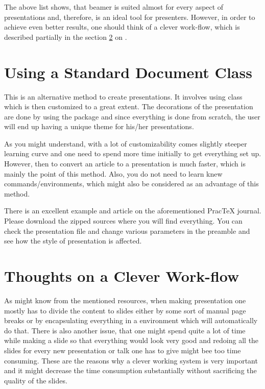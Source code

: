 \documentclass[
]{scrartcl}
\begin{document}
%
The above list shows, that beamer is suited almost for every aspect of
    presentations and, therefore, is an ideal tool for presenters.
%
However, in order to achieve even better results, one should think of a clever
    work-flow, which is described partially in the section
    \ref{sec:clever-workflow} on \pageref{sec:clever-workflow}.


\section{Using a Standard Document Class}

%
This is an alternative method to create presentations.
%
It involves using  class which is then customized to a great
    extent.
%
The decorations of the presentation are done by using the  package and
    since everything is done from scratch, the user will end up having a unique
    theme for his/her presentations.

%
As you might understand, with a lot of customizability comes slightly steeper
    learning curve and one need to spend more time initially to get everything
    set up.
%
However, then to convert an article to a presentation is much faster, which is
    mainly the point of this method.
%
Also, you do not need to learn knew commands/environments, which might also be
    considered as an advantage of this method.

%
There is an excellent example and article on the aforementioned
    PracTeX{} journal\cite{PracTeX-komapres}.
%
Please download the zipped sources where you will find everything.
%
You can check the presentation  file and change various parameters in
    the preamble and see how the style of presentation is affected.

\section{Thoughts on a Clever Work-flow}
\label{sec:clever-workflow}

%
As might know from the mentioned resources, when making presentation one mostly
    has to divide the content to slides either by some sort of manual page
    breaks or by encapsulating everything in a  environment which
    will automatically do that.
%
There is also another issue, that one might spend quite a lot of time while
    making a slide so that everything would look very good and redoing all the
    slides for every new presentation or talk one has to give might bee too time
    consuming.
%
These are the reasons why a clever working system is very important and it might
    decrease the time consumption substantially without sacrificing the quality
    of the slides.
\end{document}
